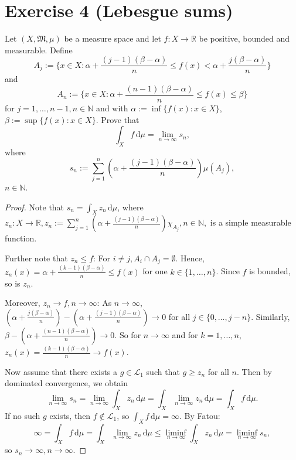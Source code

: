 \documentclass[10pt]{article}\usepackage[]{graphicx}\usepackage[]{color}
\newcommand{\N}{\mathbb{N}}
\newcommand{\R}{\mathbb{R}}
\newcommand{\df}{\,\textrm{d}}
\begin{document}
\section*{Exercise 4 (Lebesgue sums)}
Let $(X, \mathfrak{M}, \mu)$ be a measure space and
let $f : X \to \R$ be positive, bounded and measurable.
Define
\[
  A_j := \{x \in X : \alpha + \frac{(j - 1)(\beta - \alpha)}{n} \leq f(x) < \alpha + \frac{j(\beta - \alpha)}{n}\}
\]
and
\[
  A_n := \{x \in X : \alpha + \frac{(n-1)(\beta - \alpha)}{n} \leq f(x) \leq \beta\}
\]
for $j = 1, \dots, n-1, n \in \N$ and with
$\alpha := \inf\{f(x) : x \in X\}$,
$\beta := \sup\{f(x): x \in X\}$.
Prove that
\[
  \int_X f \df \mu = \lim_{n \to \infty} s_n,
\]
where
\[
  s_n := \sum_{j = 1}^n \left(\alpha + \frac{(j-1)(\beta - \alpha)}{n}\right) \mu(A_j),
\]
$n \in \N$.
\begin{proof}
  Note that $s_n = \int_X z_n \df \mu$, where
  $z_n : X \to \R, z_n := \sum_{j = 1}^n \left(\alpha + \frac{(j-1)(\beta - \alpha)}{n}\right) \chi_{A_j}, n \in \N,$
  is a simple measurable function.
  
  Further note that $z_n \leq f$: For $i \neq j, A_i \cap A_j = \emptyset$.
  Hence, $z_n(x) = \alpha + \frac{(k-1)(\beta - \alpha)}{n} \leq f(x)$ for one $k \in \{1, \dots, n\}$.
  Since $f$ is bounded, so is $z_n$.
  
  Moreover, $z_n \to f, n \to \infty$:
  As $n \to \infty$, $\left(\alpha + \frac{j(\beta - \alpha)}{n}\right) - \left(\alpha + \frac{(j - 1)(\beta - \alpha)}{n}\right) \to 0$
  for all $j \in \{0, \dots, j-n\}$. Similarly,
  $\beta - \left(\alpha + \frac{(n-1)(\beta - \alpha)}{n}\right) \to 0$.
  So for $n \to \infty$ and for $k = 1, \dots, n$, $z_n(x) = \frac{(k-1)(\beta - \alpha)}{n} \to f(x)$.
  
  Now assume that there exists a $g \in \mathscr{L}_1$ such that $g \geq z_n$ for all $n$.
  Then by dominated convergence, we obtain
  \[
    \lim_{n \to \infty} s_n = \lim_{n \to \infty} \int_X z_n \df \mu = \int_X \lim_{n \to \infty} z_n \df \mu = \int_X f \df \mu. 
  \]
  If no such $g$ exists, then $f \notin \mathscr{L}_1$, so $\int_X f \df \mu = \infty$. By Fatou:
  \[
    \infty = \int_X f \df \mu = \int_X \lim_{n \to \infty} z_n \df \mu \leq \liminf_{n \to \infty} \int_X z_n \df \mu = \liminf_{n \to \infty} s_n,
  \]
  so $s_n \to \infty, n \to \infty$.
\end{proof}
\end{document}
